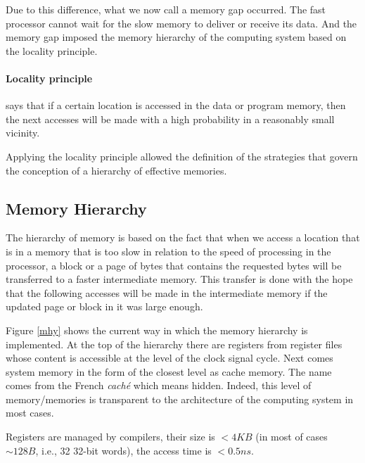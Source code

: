 
Due to this difference, what we now call a memory gap occurred. The fast processor cannot wait for the slow memory to deliver or receive its data. And the memory gap imposed the memory hierarchy of the computing system based on the locality principle.

\paragraph{Locality principle} says that if a certain location is accessed in the data or program memory, then the next accesses will be made with a high probability in a reasonably small vicinity.

\bigskip

Applying the locality principle allowed the definition of the strategies that govern the conception of a hierarchy of effective memories.

\subsection{Memory Hierarchy}

The hierarchy of memory is based on the fact that when we access a location that is in a memory that is too slow in relation to the speed of processing in the processor, a block or a page of bytes that contains the requested bytes will be transferred to a faster intermediate memory. This transfer is done with the hope that the following accesses will be made in the intermediate memory if the updated page or block in it was large enough.

Figure \ref{mhy} shows the current way in which the memory hierarchy is implemented. At the top of the hierarchy there are registers from register files whose content is accessible at the level of the clock signal cycle. Next comes system memory in the form of the closest level as cache memory. The name comes from the French {\em cach\' e} which means hidden. Indeed, this level of memory/memories is transparent to the architecture of the computing system in most cases.


Registers  are managed by compilers, their size is $< 4KB$ (in most of cases $\sim 128B$, i.e., 32 32-bit words), the access time is $< 0.5 ns$.

